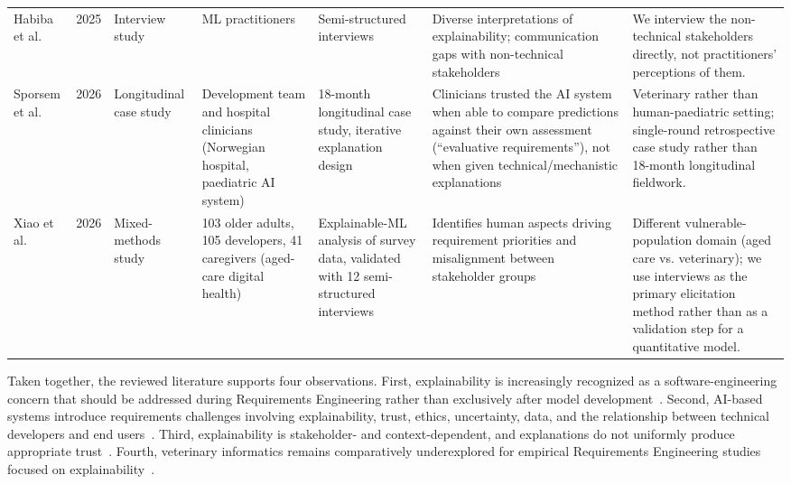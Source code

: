 \documentclass[pdflatex,sn-mathphys-num,Numbered]{sn-jnl}
\begin{document}
\begin{table}
\begin{tabular}{@{}L{2.1cm}L{0.6cm}L{1.5cm}L{2.5cm}L{2.8cm}L{3.9cm}L{3.6cm}@{}}
Habiba et al.~\cite{habiba2025} & 2025 & Interview study & ML practitioners & Semi-structured interviews & Diverse interpretations of explainability; communication gaps with non-technical stakeholders & We interview the non-technical stakeholders directly, not practitioners' perceptions of them. \\
Sporsem et al.~\cite{sporsem2026} & 2026 & Longitudinal case study & Development team and hospital clinicians (Norwegian hospital, paediatric AI system) & 18-month longitudinal case study, iterative explanation design & Clinicians trusted the AI system when able to compare predictions against their own assessment (``evaluative requirements''), not when given technical/mechanistic explanations & Veterinary rather than human-paediatric setting; single-round retrospective case study rather than 18-month longitudinal fieldwork. \\
Xiao et al.~\cite{xiao2026} & 2026 & Mixed-methods study & 103 older adults, 105 developers, 41 caregivers (aged-care digital health) & Explainable-ML analysis of survey data, validated with 12 semi-structured interviews & Identifies human aspects driving requirement priorities and misalignment between stakeholder groups & Different vulnerable-population domain (aged care vs. veterinary); we use interviews as the primary elicitation method rather than as a validation step for a quantitative model. \\
\bottomrule
\end{tabular}
\end{table}

Taken together, the reviewed literature supports four observations. First, explainability is increasingly recognized as a software-engineering concern that should be addressed during Requirements Engineering rather than exclusively after model development~\cite{kohl2019,chazette2020,chazette2021,chazette2022,deters2024,droste2025,obaidi2025}. Second, AI-based systems introduce requirements challenges involving explainability, trust, ethics, uncertainty, data, and the relationship between technical developers and end users~\cite{habiba2022,ahmad2023,habiba2024,habibullah2023,heyn2024}. Third, explainability is stakeholder- and context-dependent, and explanations do not uniformly produce appropriate trust~\cite{debritoduarte2023,freyer2024,rosenbacke2024,habiba2025,xiao2026}. Fourth, veterinary informatics remains comparatively underexplored for empirical Requirements Engineering studies focused on explainability~\cite{lustgarten2020}.
\end{document}
